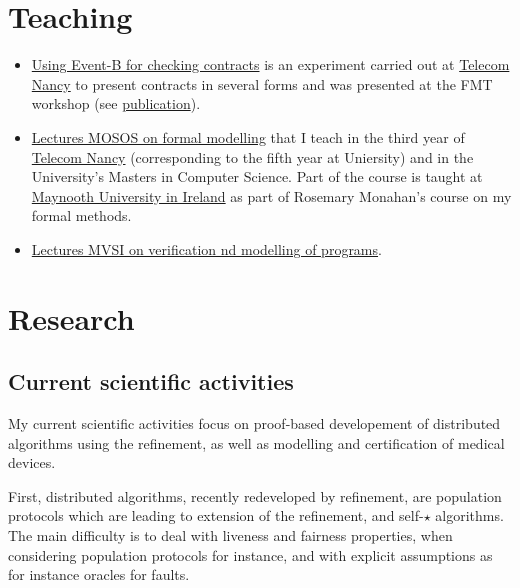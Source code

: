 \documentclass[ 12pt]{article}
\begin{document}
\section{Teaching}





\begin{itemize}

 
\item[] \href{https://mery54.github.io/fmt/}{Using Event-B  for
    checking contracts}   is an experiment carried out at \href{}{Telecom Nancy} to present contracts in several forms and was presented at the FMT workshop (see \href{https://link.springer.com/chapter/10.1007/978-3-031-71379-8_6}{publication}). 
  
\item[] \href{https://mery54.github.io/teaching/mosos/}{Lectures MOSOS 
    on formal modelling}  that I teach in the third year of
\href{https://telecomnancy.univ-lorraine.fr}{Telecom Nancy} (corresponding to the fifth year at Uniersity)
and in the University's Masters in Computer Science.  Part of the
course is taught at  \href{https://www.maynoothuniversity.ie/}{Maynooth University  in Ireland} as part of Rosemary Monahan's course on my formal methods.
  


  \item[] \href{https://mery54.github.io/teaching/mvsi/}{Lectures MVSI 
    on  verification  nd modelling of programs}.


  
\end{itemize}

\section{Research}


\subsection{Current scientific activities}


  My current  scientific activities focus  on proof-based developement
  of distributed  algorithms  using    the refinement, as     well as
  modelling and certification of medical devices.

  First, distributed  algorithms,  recently redeveloped by refinement,
  are population protocols  which  are  leading  to extension  of  the
  refinement,  and self-$\star$ algorithms. The  main difficulty is to
  deal    with liveness   and   fairness properties,  when  considering
  population protocols for  instance, and with explicit assumptions as for instance 
  oracles for faults.
\end{document}
